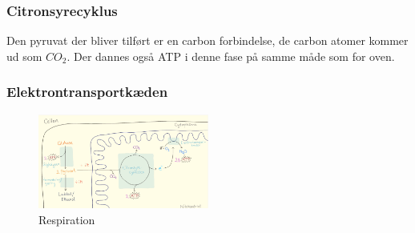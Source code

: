             \subsubsection*{Citronsyrecyklus}
                Den pyruvat der bliver tilført er en carbon forbindelse, de carbon atomer kommer ud som \begin{math}CO_2\end{math}. Der dannes også ATP i denne fase på samme måde som for oven.

            \subsubsection*{Elektrontransportkæden}
                \begin{figure}
                    \centering
                    \includegraphics[width=0.5\textwidth]{figurs/respiration.png}
                    \caption{Respiration}
                    \label{fig:respiration}
                \end{figure}
                \newpage
                

